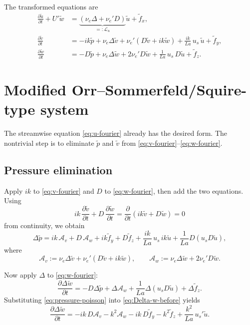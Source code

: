 \documentclass[11pt]{article}
\begin{document}
The transformed equations are
\begin{subequations}
\begin{align}
\frac{\partial \tilde u}{\partial t} + U' \tilde w
&=
\underbrace{\left(\nu_e \Delta + \nu_e' D\right)}_{=: \mathcal L_u}\tilde u
+\tilde f_x,
\label{eq:u-fourier}
\\
\frac{\partial \tilde v}{\partial t}
&=
-ik\tilde p
+\nu_e\Delta \tilde v
+\nu_e'\left(D\tilde v + ik\tilde w\right)
+\frac{ik}{La}\,u_s\,\tilde u
+\tilde f_y,
\label{eq:v-fourier}
\\
\frac{\partial \tilde w}{\partial t}
&=
-D\tilde p
+\nu_e\Delta \tilde w
+2\nu_e' D\tilde w
+\frac{1}{La}\,u_s\,D\tilde u
+\tilde f_z.
\label{eq:w-fourier}
\end{align}
\end{subequations}

\section{Modified Orr--Sommerfeld/Squire-type system}

The streamwise equation \eqref{eq:u-fourier} already has the desired form. The nontrivial step is to eliminate \(\tilde p\) and \(\tilde v\) from \eqref{eq:v-fourier}--\eqref{eq:w-fourier}.

\subsection{Pressure elimination}

Apply \(ik\) to \eqref{eq:v-fourier} and \(D\) to \eqref{eq:w-fourier}, then add the two equations. Using
\[
ik\,\frac{\partial \tilde v}{\partial t}
+D\,\frac{\partial \tilde w}{\partial t}
=
\frac{\partial}{\partial t}(ik\tilde v + D\tilde w)
=0
\]
from continuity, we obtain
\begin{equation}
\Delta \tilde p
=
ik\,\mathcal A_v + D\,\mathcal A_w
+ik\tilde f_y + D\tilde f_z
+\frac{ik}{La}\,u_s\,ik\tilde u
+\frac{1}{La}D\!\left(u_s D\tilde u\right),
\label{eq:pressure-poisson}
\end{equation}
where
\begin{equation}
\mathcal A_v := \nu_e\Delta \tilde v + \nu_e'(D\tilde v + ik\tilde w),
\qquad
\mathcal A_w := \nu_e\Delta \tilde w + 2\nu_e' D\tilde w.
\label{eq:Aw-Av}
\end{equation}

Now apply \(\Delta\) to \eqref{eq:w-fourier}:
\begin{equation}
\frac{\partial \Delta \tilde w}{\partial t}
=
-D\Delta \tilde p
+\Delta \mathcal A_w
+\frac{1}{La}\Delta\!\left(u_s D\tilde u\right)
+\Delta \tilde f_z.
\label{eq:Delta-w-before}
\end{equation}
Substituting \eqref{eq:pressure-poisson} into \eqref{eq:Delta-w-before} yields
\begin{equation}
\frac{\partial \Delta \tilde w}{\partial t}
=
-ik\,D\mathcal A_v
-k^2 \mathcal A_w
-ik\,D\tilde f_y
-k^2 \tilde f_z
+\frac{k^2}{La}\,u_s'\tilde u.
\label{eq:Delta-w-intermediate}
\end{equation}
\end{document}
